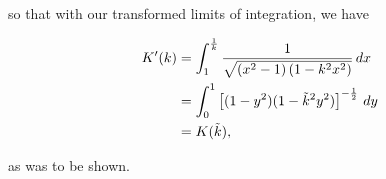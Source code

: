 \begin{solution}
  so that with our transformed limits of integration, we have 

  \begin{align*}
    K'(k) &= \int_1^{\frac{1}{k}} \frac{1}{\sqrt{\left(x^2 - 1\right)\left(1 - k^2 x^2\right)}} \, dx \\
          &= \int_0^1 \left[(1 - y^2)(1 - \tilde{k}^2 y^2) \right]^{-\frac{1}{2}} \, dy \\
          &= K(\tilde{k}),
  \end{align*}

  as was to be shown.
  \ \\
\end{solution}